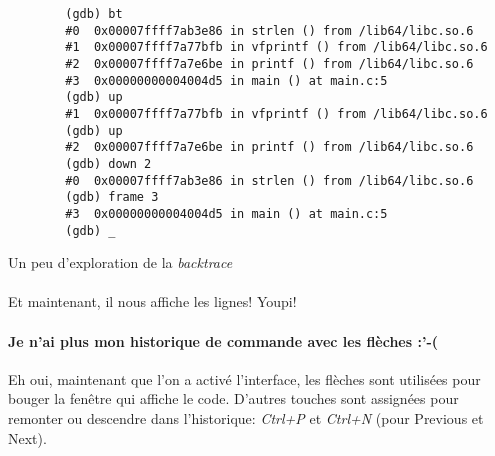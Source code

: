 \begin{listing}[H]
	\begin{verbatim}
		(gdb) bt
		#0  0x00007ffff7ab3e86 in strlen () from /lib64/libc.so.6
		#1  0x00007ffff7a77bfb in vfprintf () from /lib64/libc.so.6
		#2  0x00007ffff7a7e6be in printf () from /lib64/libc.so.6
		#3  0x00000000004004d5 in main () at main.c:5
		(gdb) up
		#1  0x00007ffff7a77bfb in vfprintf () from /lib64/libc.so.6
		(gdb) up
		#2  0x00007ffff7a7e6be in printf () from /lib64/libc.so.6
		(gdb) down 2
		#0  0x00007ffff7ab3e86 in strlen () from /lib64/libc.so.6
		(gdb) frame 3
		#3  0x00000000004004d5 in main () at main.c:5
		(gdb) _
	\end{verbatim}
	\caption{Un peu d'exploration de la \textit{backtrace}}
\end{listing}

\paragraph{} Et maintenant, il nous affiche les lignes! Youpi!

\paragraph{Je n'ai plus mon historique de commande avec les flèches :'-(} Eh
oui, maintenant que l'on a activé l'interface, les flèches sont utilisées pour
bouger la fenêtre qui affiche le code. D'autres touches sont assignées pour
remonter ou descendre dans l'historique: \textit{Ctrl+P} et \textit{Ctrl+N}
(pour Previous et Next).
